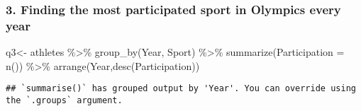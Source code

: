 \documentclass[
]{article}
\newenvironment{Shaded}{\begin{snugshade}}{\end{snugshade}}
\newcommand{\AttributeTok}[1]{\textcolor[rgb]{0.77,0.63,0.00}{#1}}
\newcommand{\CommentTok}[1]{\textcolor[rgb]{0.56,0.35,0.01}{\textit{#1}}}
\newcommand{\FunctionTok}[1]{\textcolor[rgb]{0.00,0.00,0.00}{#1}}
\newcommand{\NormalTok}[1]{#1}
\newcommand{\OtherTok}[1]{\textcolor[rgb]{0.56,0.35,0.01}{#1}}
\newcommand{\SpecialCharTok}[1]{\textcolor[rgb]{0.00,0.00,0.00}{#1}}
\newcommand{\StringTok}[1]{\textcolor[rgb]{0.31,0.60,0.02}{#1}}
\begin{document}
\hypertarget{finding-the-most-participated-sport-in-olympics-every-year}{%
\subsubsection{3. Finding the most participated sport in Olympics every
year}\label{finding-the-most-participated-sport-in-olympics-every-year}}

\begin{Shaded}
\begin{Highlighting}[]
\NormalTok{q3}\OtherTok{\textless{}{-}}
\NormalTok{athletes }\SpecialCharTok{\%\textgreater{}\%} 
  \FunctionTok{group\_by}\NormalTok{(Year, Sport) }\SpecialCharTok{\%\textgreater{}\%}
  \FunctionTok{summarize}\NormalTok{(}\AttributeTok{Participation =} \FunctionTok{n}\NormalTok{()) }\SpecialCharTok{\%\textgreater{}\%}
  \FunctionTok{arrange}\NormalTok{(Year,}\FunctionTok{desc}\NormalTok{(Participation))}
\end{Highlighting}
\end{Shaded}

\begin{verbatim}
## `summarise()` has grouped output by 'Year'. You can override using the `.groups` argument.
\end{verbatim}

\begin{Shaded}
\end{Shaded}
\end{document}
